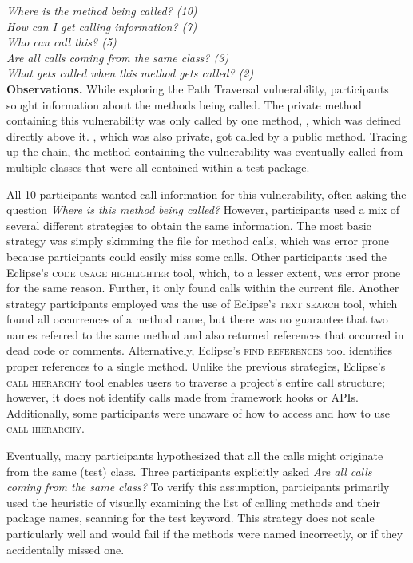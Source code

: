 \documentclass[conference]{IEEEtran}
\begin{document}
\noindent\emph{Where is the method being called? (10)} \\
\emph{How can I get calling information? (7)} \\
\emph{Who can call this? (5)} \\
\emph{Are all calls coming from the same class? (3)} \\
\emph{What gets called when this method gets called? (2)} \\



\noindent\textbf{Observations.}
While exploring the Path Traversal vulnerability, participants sought information about the methods being called. 
The private method containing this vulnerability was only called by one method, , which was defined directly above it. , which was also private, got called by a public method. Tracing up the chain, the method containing the vulnerability was eventually called from multiple classes that were all contained within a test package.

All 10 participants wanted call information for this vulnerability, often asking the question \textit{Where is this method being called?} 
However, participants used a mix of several different strategies to obtain the same information.
The most basic strategy was simply skimming the file for method calls, which was error prone because participants could easily miss some calls.
Other participants used the Eclipse's \textsc{code usage highlighter} tool, which, to a lesser extent, was error prone for the same reason. Further, it only found calls within the current file.
Another strategy participants employed was the use of Eclipse's \textsc{text search} tool, which found all occurrences of a method name, but there was no guarantee that two names referred to the same method and also returned references that occurred in dead code or comments.
Alternatively, Eclipse's \textsc{find references} tool identifies proper references to a single method.
Unlike the previous strategies, Eclipse's \textsc{call hierarchy} tool enables users to traverse a project's entire call structure; however, it does not identify calls made from framework hooks or APIs.
Additionally, some participants were unaware of how to access and how to use \textsc{call hierarchy}.

Eventually, many participants hypothesized that all the calls might originate from the same (test) class. Three participants explicitly asked \textit{Are all calls coming from the same class?} To verify this assumption, participants primarily used the heuristic of visually examining the list of calling methods and their package names, scanning for the test keyword. This strategy does not scale particularly well and would fail if the methods were named incorrectly, or if they accidentally missed one.
\\
\end{document}
